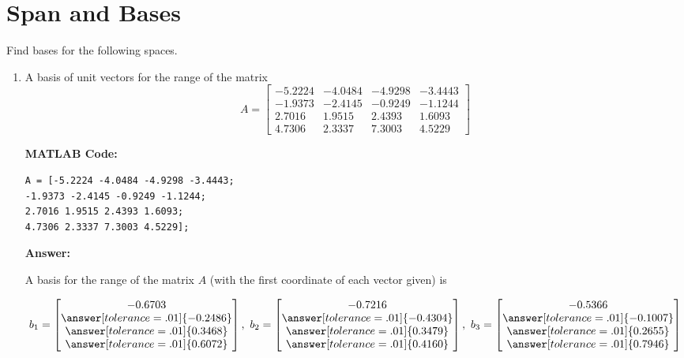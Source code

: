 \documentclass{ximera}
\begin{document}
\section*{Span and Bases}

\begin{example}
Find bases for the following spaces.

\begin{enumerate}
    \item A basis of unit vectors for the range of the matrix \[
A = \begin{bmatrix} 
-5.2224 & -4.0484 & -4.9298 & -3.4443 \\ 
-1.9373 & -2.4145 & -0.9249 & -1.1244 \\ 
2.7016 & 1.9515 & 2.4393 & 1.6093 \\ 
4.7306 & 2.3337 & 7.3003 & 4.5229 
\end{bmatrix}
\]

\textbf{MATLAB Code:}

\begin{verbatim}
A = [-5.2224 -4.0484 -4.9298 -3.4443; 
-1.9373 -2.4145 -0.9249 -1.1244; 
2.7016 1.9515 2.4393 1.6093; 
4.7306 2.3337 7.3003 4.5229];
\end{verbatim}

    \textbf{Answer:}

    A basis for the range of the matrix $A$ (with the first coordinate of each vector given) is 

    \[
b_1 = \begin{bmatrix} -0.6703 \\ \answer[tolerance=.01]{-0.2486} \\ \answer[tolerance=.01]{0.3468} \\ \answer[tolerance=.01]{0.6072} \end{bmatrix}, \quad
b_2 = \begin{bmatrix} -0.7216 \\ \answer[tolerance=.01]{-0.4304} \\ \answer[tolerance=.01]{0.3479} \\ \answer[tolerance=.01]{0.4160} \end{bmatrix}, \quad
b_3 = \begin{bmatrix} -0.5366 \\ \answer[tolerance=.01]{-0.1007} \\ \answer[tolerance=.01]{0.2655} \\ \answer[tolerance=.01]{0.7946} \end{bmatrix}
\]


\end{enumerate}
\end{example}
\end{document}
